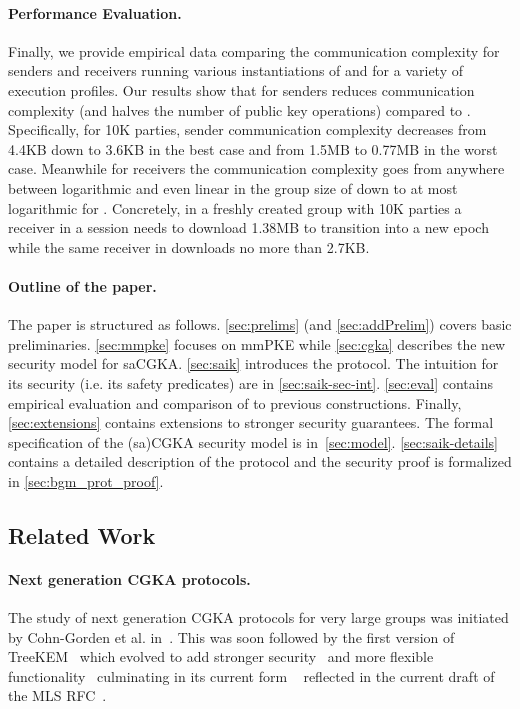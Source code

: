 \paragraph{Performance Evaluation.}
Finally, we provide empirical data comparing the communication complexity for
senders and receivers running various instantiations of \saik and \protITK
for a variety of execution profiles. Our results show that for senders \saik
reduces communication complexity (and halves the number of public key
operations) compared to \protITK. Specifically, for 10K parties, sender
communication complexity decreases from 4.4KB down to 3.6KB in the best case
and from 1.5MB to 0.77MB in the worst case. Meanwhile for receivers the
communication complexity goes from anywhere between logarithmic and even
linear in the group size of \protITK down to at most logarithmic for \saik. Concretely, in a freshly created group with
10K parties a receiver in a \protITK session needs to download 1.38MB to transition into a
new epoch while the same receiver in \saik downloads no more than 2.7KB.

\paragraph{Outline of the paper.}
The paper is structured as follows. \cref{sec:prelims}
(and \cref{sec:addPrelim}) covers basic preliminaries. \cref{sec:mmpke}
focuses on mmPKE while \cref{sec:cgka} describes the new security model for
saCGKA. \cref{sec:saik} introduces the \saik protocol.
The intuition for its security (i.e. its safety predicates) are in
\cref{sec:saik-sec-int}. \cref{sec:eval} contains empirical
evaluation and comparison of \saik to previous constructions. Finally, \cref{sec:extensions} contains extensions
to stronger security guarantees.
The formal specification of the (sa)CGKA security
model is in~\cref{sec:model}. \cref{sec:saik-details} contains a detailed description of the \saik protocol and the
security proof is formalized in \cref{sec:bgm_prot_proof}.

\subsection{Related Work}

\paragraph{Next generation CGKA protocols.}
The study of next generation CGKA protocols for very large groups was
initiated by Cohn-Gorden et al. in~\cite{CCS:CCGMM18}. This was soon followed
by the first version of TreeKEM~\cite{TreeKEM-original-email} which
evolved to add stronger
security~\cite{TreeKEM-original-email,TreeKEM-with-blanking-email,TreeKEM-tree-signing-email}
and more flexible functionality~\cite{TreeKEM-prop-and-comm-email}
culminating in its current form \protITK{}~\cite{EPRINT:AlwJosMul20}
reflected in the current draft of the MLS RFC~\cite{mls-protocol-latest}.

